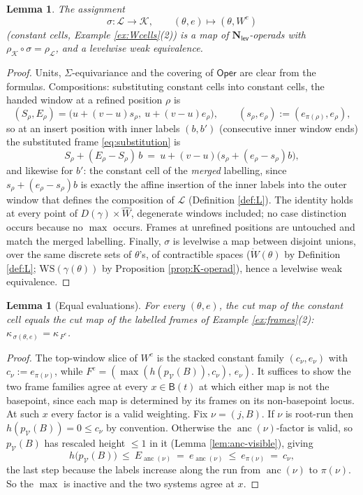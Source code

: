 \documentclass[12pt]{amsart}
\newtheorem{lemma}[subsection]{Lemma}
\theoremstyle{definition}
\theoremstyle{remark}
\newcommand{\Oper}{\mathsf{Oper}}
\newcommand{\Cal}[1]{\mathcal{#1}}
\newcommand{\Nl}{\mathbf{N}_{\mathsf{lev}}}
\newcommand{\BC}{\mathsf{B}}                     %
\newcommand{\Kop}{\mathcal{K}}                   %
\newcommand{\Lop}{\mathcal{L}}                   %
\newcommand{\anc}{\operatorname{anc}}            %
\newcommand{\Dg}[1]{D(#1)}                       %
\begin{document}
\begin{lemma}\label{lem:sigma-strict}
The assignment
\[ \sigma\colon \Lop\longrightarrow \Kop, \quad\quad (\theta, e)\mapsto (\theta, W^{e})\]
(constant cells, Example \ref{ex:Wcells}(2)) is a map of $\Nl$-operads with $\rho_{\Kop}\circ\sigma = \rho_{\Lop}$, and a levelwise weak equivalence.
\end{lemma}

\begin{proof}
Units, $\Sigma$-equivariance and the covering of $\Oper$ are clear from the formulas. Compositions: substituting constant cells into constant cells, the handed window at a refined position $\rho$ is
\[ (S_\rho, E_\rho) = \big( u + (v-u)s_\rho,\ u + (v-u)e_\rho \big), \quad\quad (s_\rho, e_\rho) := (e_{\pi(\rho)}, e_\rho),\]
so at an insert position with inner labels $(b, b')$ (consecutive inner window ends) the substituted frame \eqref{eq:substitution} is
\[ S_\rho + (E_\rho - S_\rho)\,b \ =\ u + (v-u)\big( s_\rho + (e_\rho - s_\rho) b\big), \]
and likewise for $b'$: the constant cell of the \emph{merged} labelling, since $s_\rho + (e_\rho - s_\rho)b$ is exactly the affine insertion of the inner labels into the outer window that defines the composition of $\Lop$ (Definition \ref{def:L}). The identity holds at every point of $\Dg{\gamma}\times\widehat{W}$, degenerate windows included; no case distinction occurs because no $\max$ occurs. Frames at unrefined positions are untouched and match the merged labelling. Finally, $\sigma$ is levelwise a map between disjoint unions, over the same discrete sets of $\theta$'s, of contractible spaces ($\mathring{W}(\theta)$ by Definition \ref{def:L}; $\mathrm{WS}(\gamma(\theta))$ by Proposition \ref{prop:K-operad}), hence a levelwise weak equivalence.
\end{proof}

\begin{lemma}[Equal evaluations]\label{lem:equal-evals}
For every $(\theta, e)$, the cut map of the constant cell equals the cut map of the labelled frames of Example \ref{ex:frames}(2): $\kappa_{\,\sigma(\theta,e)\,} = \kappa_{\,F^{e}}$.
\end{lemma}

\begin{proof}
The top-window slice of $W^{e}$ is the stacked constant family $(c_\nu, e_\nu)$ with $c_\nu := e_{\pi(\nu)}$, while $F^{e} = (\max(h(p_{\Cal{V}}(B)), c_\nu),\, e_\nu)$. It suffices to show the two frame families agree at every $x\in\BC(t)$ at which either map is not the basepoint, since each map is determined by its frames on its non-basepoint locus. At such $x$ every factor is a valid weighting. Fix $\nu = (j,B)$. If $\nu$ is root-run then $h(p_{\Cal{V}}(B)) = 0\leq c_\nu$ by convention. Otherwise the $\anc(\nu)$-factor is valid, so $p_{\Cal{V}}(B)$ has rescaled height $\leq 1$ in it (Lemma \ref{lem:anc-visible}), giving
\[ h\big(p_{\Cal{V}}(B)\big) \ \leq\ E_{\anc(\nu)} \ =\ e_{\anc(\nu)} \ \leq\ e_{\pi(\nu)} \ =\ c_\nu,\]
the last step because the labels increase along the run from $\anc(\nu)$ to $\pi(\nu)$. So the $\max$ is inactive and the two systems agree at $x$.
\end{proof}
\end{document}
